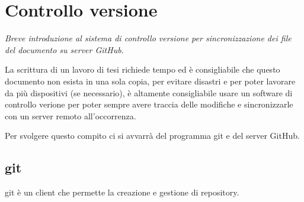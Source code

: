 \documentclass[envcountsame,envcountchap]{svmono}
\begin{document}
    
    

                
                
    

\chapter{Controllo versione} \label{Cap.2}

\vspace{2cm}

\begin{flushright}
\textit{Breve introduzione al sistema di controllo versione per sincronizzazione dei file del documento su server GitHub.}
\end{flushright}

\vspace{0.5cm}

La scrittura di un lavoro di tesi richiede tempo ed è consigliabile che questo documento non esista in una sola copia,
per evitare disastri e per poter lavorare da più dispositivi (se necessario), è altamente consigliabile usare un software
di controllo verione per poter sempre avere traccia delle modifiche e sincronizzarle con un server remoto all'occorrenza.

Per svolgere questo compito ci si avvarrà del programma git e del server GitHub.

\section{git}
git è un client che permette la creazione e gestione di repository.
\end{document}
